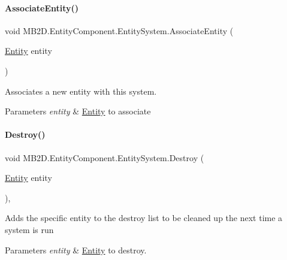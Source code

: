 \paragraph{\texorpdfstring{Associate\+Entity()}{AssociateEntity()}}
{\footnotesize\ttfamily void M\+B2\+D.\+Entity\+Component.\+Entity\+System.\+Associate\+Entity (\begin{DoxyParamCaption}\item[{\hyperlink{class_m_b2_d_1_1_entity_component_1_1_entity}{Entity}}]{entity }\end{DoxyParamCaption})\hspace{0.3cm}{\ttfamily [inline]}}



Associates a new entity with this system. 


\begin{DoxyParams}{Parameters}
{\em entity} & \hyperlink{class_m_b2_d_1_1_entity_component_1_1_entity}{Entity} to associate\\
\hline
\end{DoxyParams}
\hypertarget{class_m_b2_d_1_1_entity_component_1_1_entity_system_a86f27e2e12da562903092d5afb9dd70d}{}\label{class_m_b2_d_1_1_entity_component_1_1_entity_system_a86f27e2e12da562903092d5afb9dd70d} 
\paragraph{\texorpdfstring{Destroy()}{Destroy()}}
{\footnotesize\ttfamily void M\+B2\+D.\+Entity\+Component.\+Entity\+System.\+Destroy (\begin{DoxyParamCaption}\item[{\hyperlink{class_m_b2_d_1_1_entity_component_1_1_entity}{Entity}}]{entity }\end{DoxyParamCaption})\hspace{0.3cm}{\ttfamily [inline]}, {\ttfamily [protected]}}



Adds the specific entity to the destroy list to be cleaned up the next time a system is run 


\begin{DoxyParams}{Parameters}
{\em entity} & \hyperlink{class_m_b2_d_1_1_entity_component_1_1_entity}{Entity} to destroy.\\
\hline
\end{DoxyParams}
\hypertarget{class_m_b2_d_1_1_entity_component_1_1_entity_system_ae8d1330e220d3ae7c8f6640c5d4aacd0}{}\label{class_m_b2_d_1_1_entity_component_1_1_entity_system_ae8d1330e220d3ae7c8f6640c5d4aacd0} 
